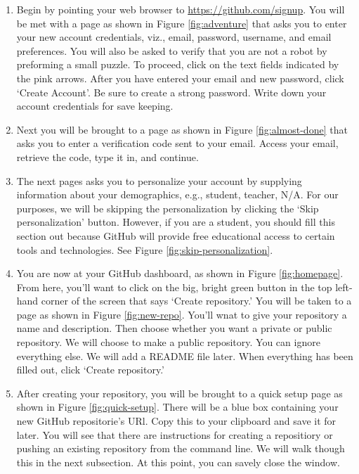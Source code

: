 \documentclass{article}
\begin{document}
\begin{enumerate}

	\item

		Begin by pointing your web browser to
		\url{https://github.com/signup}.  You will be met with a page as
		shown in Figure \ref{fig:adventure} that asks you to enter your
		new account credentials, viz., email, password, username, and
		email preferences. You will also be asked to verify that you are
		not a robot by preforming a small puzzle.  To proceed, click on
		the text fields indicated by the pink arrows. After you have
		entered your email and new password, click `Create Account'. Be
		sure to create a strong password. Write down your account
		credentials for save keeping.

	\item

		Next you will be brought to a page as shown in Figure
		\ref{fig:almost-done} that asks you to enter a verification code
		sent to your email. Access your email, retrieve the code, type
		it in, and continue.

	\item

		The next pages asks you to personalize your account by supplying
		information about your demographics, e.g., student, teacher,
		N/A. For our purposes, we will be skipping the personalization
		by clicking the `Skip personalization' button. However, if you
		are a student, you should fill this section out because GitHub
		will provide free educational access to certain tools and
		technologies. See Figure \ref{fig:skip-personalization}.

	\item

		You are now at your GitHub dashboard, as shown in Figure
		\ref{fig:homepage}. From here, you'll want to click on the big,
		bright green button in the top left-hand corner of the screen
		that says `Create repository.' You will be taken to a page as
		shown in Figure \ref{fig:new-repo}. You'll wnat to give your
		repository a name and description. Then choose whether you want
		a private or public repository. We will choose to make a public
		repository. You can ignore everything else. We will add a README
		file later. When everything has been filled out, click `Create
		repository.'

	\item

		After creating your repository, you will be brought to a quick
		setup page as shown in Figure \ref{fig:quick-setup}. There will
		be a blue box containing your new GitHub repositorie's URl. Copy
		this to your clipboard and save it for later.  You will see that
		there are instructions for creating a repositiory or pushing an
		existing repository from the command line. We will walk though
		this in the next subsection.  At this point, you can savely
		close the window.

\end{enumerate}
\end{document}
